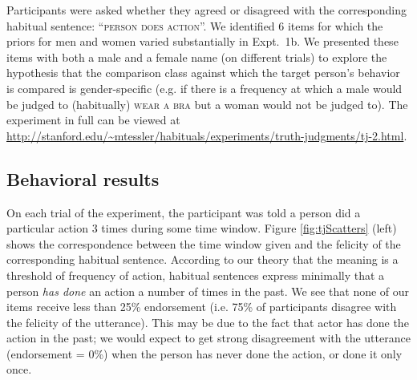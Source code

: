 \documentclass[10pt,letterpaper]{article}
\begin{document}
Participants were asked whether they agreed or disagreed with the corresponding habitual sentence: ``\textsc{person does action}''.
We identified 6 items for which the priors for men and women varied substantially in Expt.~1b.
We presented these items with both a male and a female name (on different trials) to explore the hypothesis that the comparison class against which the target person's behavior is compared is gender-specific (e.g. if there is a frequency at which a male would be judged to (habitually) \textsc{wear a bra} but a woman would not be judged to). 
The experiment in full can be viewed at \url{http://stanford.edu/~mtessler/habituals/experiments/truth-judgments/tj-2.html}.



\subsection{Behavioral results}

On each trial of the experiment, the participant was told a person did a particular action 3 times during some time window. 
Figure \ref{fig:tjScatters} (left) shows the correspondence between the time window given and the felicity of the corresponding habitual sentence. 
According to our theory that the meaning is a threshold of frequency of action, habitual sentences express minimally that a person \emph{has done} an action a number of times in the past. 
We see that none of our items receive less than 25\% endorsement (i.e. 75\% of participants disagree with the felicity of the utterance).
This may be due to the fact that actor has done the action in the past; we would expect to get strong disagreement with the utterance (endorsement = 0\%) when the person has never done the action, or done it only once.
\end{document}
